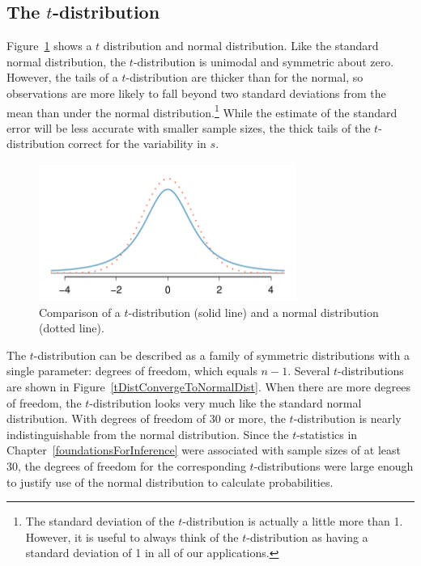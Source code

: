 \subsection{The $t$-distribution}
\label{introducingTheTDistribution}


Figure~\ref{tDistCompareToNormalDist} shows a $t$ distribution and normal distribution. Like the standard normal distribution, the $t$-distribution is unimodal and symmetric about zero.  However, the tails of a $t$-distribution are thicker than for the normal, so observations are more likely to fall beyond two standard deviations from the mean than under the normal distribution.\footnote{The standard deviation of the $t$-distribution is actually a little more than 1. However, it is useful to always think of the $t$-distribution as having a standard deviation of 1 in all of our applications.} While the estimate of the standard error will be less accurate with smaller sample sizes, the thick tails of the $t$-distribution correct for the variability in $s$.

\begin{figure}
\centering
\includegraphics[height=45mm]{ch_inference_for_means_oi_biostat/figures/tDistCompareToNormalDist/tDistCompareToNormalDist}
\caption{Comparison of a $t$-distribution (solid line) and a normal distribution (dotted line).}
\label{tDistCompareToNormalDist}
\end{figure}

The $t$-distribution can be described as a family of symmetric distributions with a single parameter: degrees of freedom, which equals $n - 1$. Several $t$-distributions are shown in Figure~\ref{tDistConvergeToNormalDist}. When there are more degrees of freedom, the $t$-distribution looks very much like the standard normal distribution. With degrees of freedom of 30 or more, the $t$-distribution is nearly indistinguishable from the normal distribution. Since the $t$-statistics in Chapter~\ref{foundationsForInference} were associated with sample sizes of at least 30, the degrees of freedom for the corresponding $t$-distributions were large enough to justify use of the normal distribution to calculate probabilities. 


